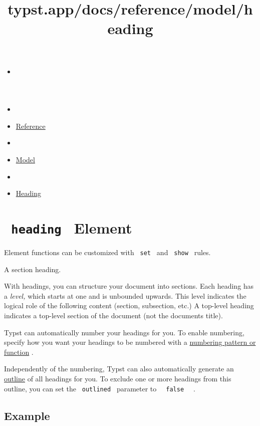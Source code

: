 \title{typst.app/docs/reference/model/heading}

\begin{itemize}
\tightlist
\item
  \href{/docs}{}
\item
  
\item
  \href{/docs/reference/}{Reference}
\item
  
\item
  \href{/docs/reference/model/}{Model}
\item
  
\item
  \href{/docs/reference/model/heading/}{Heading}
\end{itemize}

\section{\texorpdfstring{\texttt{\ heading\ } {{ Element
}}}{ heading   Element }}\label{summary}

\label{element-tooltip}
Element functions can be customized with \texttt{\ set\ } and
\texttt{\ show\ } rules.

A section heading.

With headings, you can structure your document into sections. Each
heading has a \emph{level,} which starts at one and is unbounded
upwards. This level indicates the logical role of the following content
(section, subsection, etc.) A top-level heading indicates a top-level
section of the document (not the document\textquotesingle s title).

Typst can automatically number your headings for you. To enable
numbering, specify how you want your headings to be numbered with a
\href{/docs/reference/model/numbering/}{numbering pattern or function} .

Independently of the numbering, Typst can also automatically generate an
\href{/docs/reference/model/outline/}{outline} of all headings for you.
To exclude one or more headings from this outline, you can set the
\texttt{\ outlined\ } parameter to
\texttt{\ }{\texttt{\ false\ }}\texttt{\ } .

\subsection{Example}\label{example}

